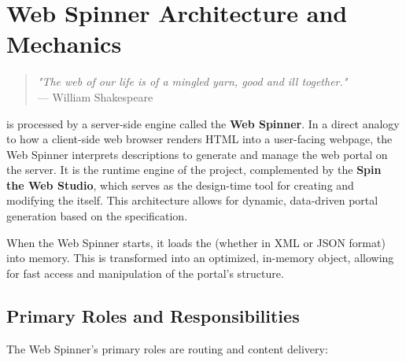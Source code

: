 
\chapter{Web Spinner Architecture and Mechanics}
\label{chap:virtualized}

\begin{quote}
\textit{"The web of our life is of a mingled yarn, good and ill together."} \\
— William Shakespeare
\end{quote}

\wbdl{} is processed by a server-side engine called the \textbf{Web Spinner}. In a direct analogy to how a client-side web browser renders HTML into a user-facing webpage, the Web Spinner interprets \wbdl{} descriptions to generate and manage the web portal on the server. It is the runtime engine of the project, complemented by the \textbf{Spin the Web Studio}, which serves as the design-time tool for creating and modifying the \webbase{} itself. This architecture allows for dynamic, data-driven portal generation based on the \wbdl{} specification.

When the Web Spinner starts, it loads the \webbase{} (whether in XML or JSON format) into memory. This \webbase{} is transformed into an optimized, in-memory object, allowing for fast access and manipulation of the portal's structure.

\section{Primary Roles and Responsibilities}
\label{sec:primary-roles}

The Web Spinner's primary roles are routing and content delivery:

